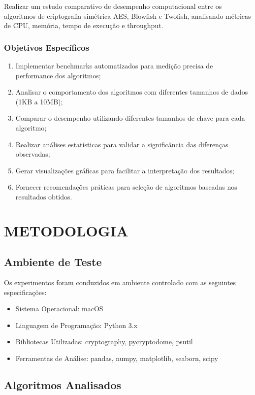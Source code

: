 \documentclass[12pt,a4paper,oneside]{article}
\begin{document}
Realizar um estudo comparativo de desempenho computacional entre os algoritmos de criptografia simétrica AES, Blowfish e Twofish, analisando métricas de CPU, memória, tempo de execução e throughput.

\subsubsection{Objetivos Específicos}

\begin{enumerate}
    \item Implementar benchmarks automatizados para medição precisa de performance dos algoritmos;
    \item Analisar o comportamento dos algoritmos com diferentes tamanhos de dados (1KB a 10MB);
    \item Comparar o desempenho utilizando diferentes tamanhos de chave para cada algoritmo;
    \item Realizar análises estatísticas para validar a significância das diferenças observadas;
    \item Gerar visualizações gráficas para facilitar a interpretação dos resultados;
    \item Fornecer recomendações práticas para seleção de algoritmos baseadas nos resultados obtidos.
\end{enumerate}

\section{METODOLOGIA}

\subsection{Ambiente de Teste}

Os experimentos foram conduzidos em ambiente controlado com as seguintes especificações:

\begin{itemize}
    \item Sistema Operacional: macOS
    \item Linguagem de Programação: Python 3.x
    \item Bibliotecas Utilizadas: cryptography, pycryptodome, psutil
    \item Ferramentas de Análise: pandas, numpy, matplotlib, seaborn, scipy
\end{itemize}

\subsection{Algoritmos Analisados}
\end{document}
